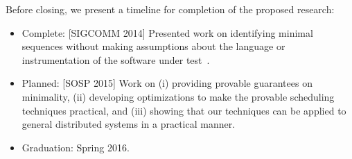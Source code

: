 Before closing, we present a timeline for completion of the proposed research:

\begin{itemize}
\item Complete: [SIGCOMM 2014] Presented work on identifying minimal sequences without making assumptions about the
language or instrumentation of the software under test~\cite{sts2014}.
\item Planned: [SOSP 2015] Work on (i) providing provable guarantees on minimality, (ii) developing optimizations
to make the provable scheduling techniques practical, and (iii) showing
that our techniques can be applied to general distributed systems in a
practical manner.
\item Graduation: Spring 2016.
\end{itemize}
